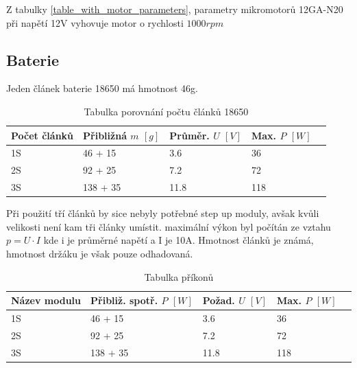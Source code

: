 Z tabulky \ref{table_with_motor_parameters}, parametry mikromotorů 12GA-N20 při napětí 12V vyhovuje motor o rychlosti $1000rpm$

\subsection{Baterie}
Jeden článek baterie 18650 má hmotnost 46g.

\begin{table}[htbp!]
	\centering
	\begin{tabularx}{\textwidth}{|X|X|X|X|X|}\hline
		Počet článků & Přibližná $m$ $\left[g\right]$ & Průměr. $U$ $\left[ V \right]$ & Max. $P$ $\left[ W \right]$ \\ \hline
		1S           & 46 + 15     & 3.6                            & 36                          \\ \hline
		2S           & 92 + 25     & 7.2                            & 72                          \\ \hline
		3S           & 138 + 35    & 11.8                           & 118                         \\ \hline
	\end{tabularx}
	\label{tab:tabulka 18650}
	\caption{Tabulka porovnání počtu článků 18650}
\end{table}
Při použití tří článků by sice nebyly potřebné step up moduly, avšak kvůli velikosti není kam tři články umístit.
maximální výkon byl počítán ze vztahu $p=U \cdot I$ kde i je průměrné napětí a I je 10A.
Hmotnost článků je známá, hmotnost držáku je však pouze odhadovaná.
\newline

\begin{table}[htbp!]
	\centering
	\begin{tabularx}{\textwidth}{|X|X|X|X|X|}\hline
		Název modulu & Přibliž. spotř. $P$ $\left[W\right]$ & Požad. $U$ $\left[ V \right]$ & Max. $P$ $\left[ W \right]$ \\ \hline
		1S           & 46 + 15     & 3.6                            & 36                          \\ \hline
		2S           & 92 + 25     & 7.2                            & 72                          \\ \hline
		3S           & 138 + 35    & 11.8                           & 118                         \\ \hline
	\end{tabularx}
	\label{tab:tabulka_prikonnu}
	\caption{Tabulka příkonů}
\end{table}

